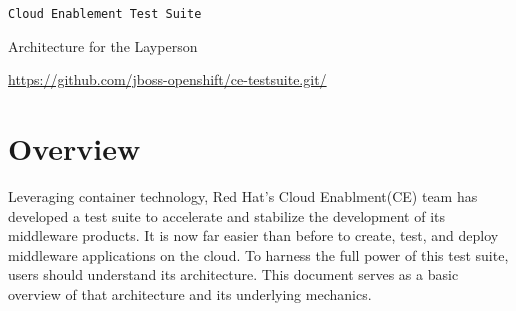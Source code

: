 \documentclass{article}
\begin{document}
      
\centerline{\texttt{Cloud Enablement Test Suite}}
\centerline{\sc Architecture for the Layperson }
\centerline{\url{https://github.com/jboss-openshift/ce-testsuite.git/}}

\vspace{1pc}
\section{Overview}

\hspace{3pc} Leveraging container technology, Red Hat's Cloud Enablment(CE) team has developed a test suite to accelerate 
and stabilize the development of its middleware products. It is now far easier than before to create, test, and deploy 
middleware applications on the cloud. To harness the full power of this test suite, users should understand its architecture. 
This document serves as a basic overview of that architecture and its underlying mechanics.
\end{document}
